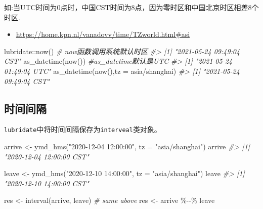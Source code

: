 \documentclass[
]{book}
\newenvironment{Shaded}{\begin{snugshade}}{\end{snugshade}}
\newcommand{\AttributeTok}[1]{\textcolor[rgb]{0.77,0.63,0.00}{#1}}
\newcommand{\CommentTok}[1]{\textcolor[rgb]{0.56,0.35,0.01}{\textit{#1}}}
\newcommand{\FunctionTok}[1]{\textcolor[rgb]{0.00,0.00,0.00}{#1}}
\newcommand{\NormalTok}[1]{#1}
\newcommand{\OtherTok}[1]{\textcolor[rgb]{0.56,0.35,0.01}{#1}}
\newcommand{\SpecialCharTok}[1]{\textcolor[rgb]{0.00,0.00,0.00}{#1}}
\newcommand{\StringTok}[1]{\textcolor[rgb]{0.31,0.60,0.02}{#1}}
\providecommand{\tightlist}{%
  \setlength{\itemsep}{0pt}\setlength{\parskip}{0pt}}
\begin{document}
如:当UTC时间为0点时，中国CST时间为8点，因为零时区和中国北京时区相差8个时区.

\begin{itemize}
\tightlist
\item
  \url{https://home.kpn.nl/vanadovv/time/TZworld.html\#asi}
\end{itemize}

\begin{Shaded}
\begin{Highlighting}[]
\NormalTok{lubridate}\SpecialCharTok{::}\FunctionTok{now}\NormalTok{() }\CommentTok{\# now函数调用系统默认时区}
\CommentTok{\#\textgreater{} [1] "2021{-}05{-}24 09:49:04 CST"}
\FunctionTok{as\_datetime}\NormalTok{(}\FunctionTok{now}\NormalTok{()) }\CommentTok{\#as\_datetime默认是UTC}
\CommentTok{\#\textgreater{} [1] "2021{-}05{-}24 01:49:04 UTC"}
\FunctionTok{as\_datetime}\NormalTok{(}\FunctionTok{now}\NormalTok{(),}\AttributeTok{tz =} \StringTok{\textquotesingle{}asia/shanghai\textquotesingle{}}\NormalTok{)}
\CommentTok{\#\textgreater{} [1] "2021{-}05{-}24 09:49:04 CST"}
\end{Highlighting}
\end{Shaded}

\hypertarget{interveal}{%
\subsection{时间间隔}\label{interveal}}

\texttt{lubridate}中将时间间隔保存为\texttt{interveal}类对象。

\begin{Shaded}
\begin{Highlighting}[]
\NormalTok{arrive }\OtherTok{\textless{}{-}} \FunctionTok{ymd\_hms}\NormalTok{(}\StringTok{"2020{-}12{-}04 12:00:00"}\NormalTok{, }\AttributeTok{tz =} \StringTok{"asia/shanghai"}\NormalTok{)}
\NormalTok{arrive}
\CommentTok{\#\textgreater{} [1] "2020{-}12{-}04 12:00:00 CST"}

\NormalTok{leave }\OtherTok{\textless{}{-}} \FunctionTok{ymd\_hms}\NormalTok{(}\StringTok{"2020{-}12{-}10 14:00:00"}\NormalTok{, }\AttributeTok{tz =} \StringTok{"asia/shanghai"}\NormalTok{)}
\NormalTok{leave}
\CommentTok{\#\textgreater{} [1] "2020{-}12{-}10 14:00:00 CST"}

\NormalTok{res }\OtherTok{\textless{}{-}} \FunctionTok{interval}\NormalTok{(arrive, leave) }
\CommentTok{\# same above}
\NormalTok{res }\OtherTok{\textless{}{-}}\NormalTok{ arrive }\SpecialCharTok{\%{-}{-}\%}\NormalTok{ leave}
\end{Highlighting}
\end{Shaded}
\end{document}
